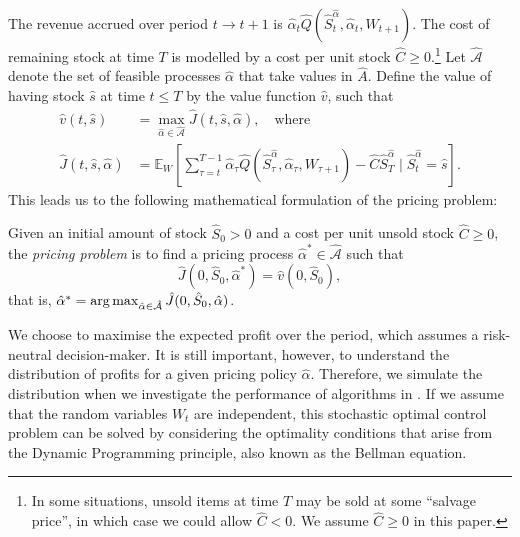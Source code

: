 \documentclass[main.tex]{subfiles}
\begin{document}
The revenue accrued over period $t\to t+1$ is $\hat{\alpha}_t\hat{Q}(\hat{S}_t^{\hat{\alpha}},\hat{\alpha}_t,W_{t+1})$.
The cost of remaining stock at time $T$ is modelled by a cost per unit
stock $\hat{C}\geq 0$.\footnote{In some situations, unsold items at time $T$
  may be sold at some ``salvage price'', in which case we could allow
  $\hat{C}<0$. We assume $\hat{C}\geq 0$ in this paper.}
Let $\hat{\mathcal{A}}$ denote the set of feasible processes $\hat{\alpha}$ that take values
in $\hat{A}$.
Define the value of having stock $\hat{s}$ at time $t\leq T$
by the value function $\hat{v}$, such that
\begin{align}\label{eq:value_function_def}
  \hat{v}(t,\hat{s})&=\max_{\hat{\alpha}\in\hat{\mathcal{A}}} \hat{J}(t,\hat{s},\hat{\alpha}),\quad\text{where}\\
  \hat{J}(t,\hat{s},\hat{\alpha})&=
                                   \mathbb E_{W}\left[ \sum_{\tau=t}^{T-1}
                                   \hat{\alpha}_\tau \hat{Q}(\hat{S}_\tau^{\hat{\alpha}},\hat{\alpha}_\tau,W_{\tau+1})
                                   - \hat{C}\hat{S}_T^{\hat{\alpha}} \mid \hat{S}_t^{\hat{\alpha}} = \hat{s}
                                   \right].
                                   \label{eq:value_function_def2}
\end{align}
This leads us to the following mathematical formulation of the pricing
problem:
\begin{mydef}
  Given an initial amount of stock $\hat{S}_0>0$ and a cost per unit unsold stock $\hat{C}\geq
  0$, the \emph{pricing problem} is to find a pricing process $\hat{\alpha}^*\in\hat{\mathcal{A}}$ such that
  \begin{equation}
    \hat{J}(0,\hat{S}_0,\hat{\alpha}^*) = \hat{v}(0,\hat{S}_0),
  \end{equation}
  that is, $\hat{\alpha}^* = \operatorname*{arg\,max}_{\hat{\alpha}\in\hat{\mathcal{A}}}\hat{J}(0,\hat{S}_0,\hat{\alpha})$.
\end{mydef}
We choose to maximise the expected profit over the period, which
assumes a risk-neutral decision-maker.
It is still
important, however,
to understand the distribution of profits for a given pricing policy
$\hat{\alpha}$. Therefore, we simulate the distribution when
we investigate the performance of algorithms in
. %
If we assume that the random variables $W_t$ are independent, this
stochastic optimal control problem can be solved by
considering the optimality conditions that arise from the Dynamic
Programming principle, also known as the Bellman equation.
\end{document}
